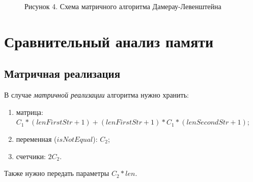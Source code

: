\documentclass[12pt]{report}
\begin{document}
	\begin{figure}[h!]\label{picture_4}
		\caption*{Рисунок 4. Схема матричного алгоритма Дамерау-Левенштейна}
	\end{figure}
	\restoregeometry
	
	\newpage
	\onehalfspacing
	\section{Сравнительный анализ памяти}
	\subsection{Матричная реализация}
	В случае \textit{матричной реализации} алгоритма нужно хранить:
	\begin{enumerate}
		\item матрица: $C_{1} * (lenFirstStr + 1) + (lenFirstStr + 1) * C_{1} * (lenSecondStr + 1)$;
		\item переменная ($isNotEqual$): $C_{2}$;
		\item счетчики: $2C_{2}$.
	\end{enumerate}
	Также нужно передать параметры $C_{2} * len$.
	
\end{document}
